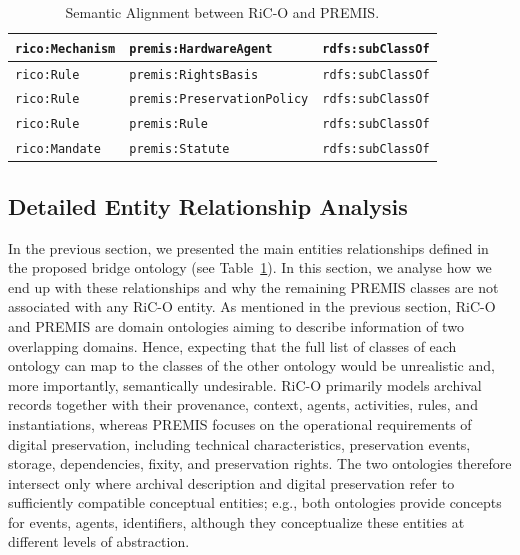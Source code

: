 \documentclass[runningheads]{llncs}
\begin{document}
\begin{table}[ht]
\begin{center}
\begin{tabular}{l  l  c}
				\texttt{rico:Mechanism} & \texttt{premis:HardwareAgent} & \texttt{rdfs:subClassOf} \\\hline
				\texttt{rico:Rule} & \texttt{premis:RightsBasis} & \texttt{rdfs:subClassOf} \\\hline
				\texttt{rico:Rule} & \texttt{premis:PreservationPolicy} & \texttt{rdfs:subClassOf} \\\hline
				\texttt{rico:Rule} & \texttt{premis:Rule} & \texttt{rdfs:subClassOf} \\\hline
				\texttt{rico:Mandate} & \texttt{premis:Statute} & \texttt{rdfs:subClassOf} \\\hline
				\hline
			\end{tabular}
		\end{center}
		\caption{Semantic Alignment between RiC-O and PREMIS.}
		\label{tab:rico-premis-mapping}
	\end{table}
	
	\subsection{Detailed Entity Relationship Analysis}
	\label{subsec:detailed-alignment}
	
	In the previous section, we presented the main entities relationships defined in the proposed bridge ontology (see Table~\ref{tab:rico-premis-mapping}). In this section, we analyse how we end up with these relationships and why the remaining PREMIS classes are not associated with any RiC-O entity. As mentioned in the previous section, RiC-O and PREMIS are domain ontologies aiming to describe information of two overlapping domains. Hence, expecting that the full list of classes of each ontology can map to the classes of the other ontology would be unrealistic and, more importantly, semantically undesirable. RiC-O primarily models archival records together with their provenance, context, agents, activities, rules, and instantiations, whereas PREMIS focuses on the operational requirements of digital preservation, including technical characteristics, preservation events, storage, dependencies, fixity, and preservation rights. The two ontologies therefore intersect only where archival description and digital preservation refer to sufficiently compatible conceptual entities; e.g., both ontologies provide concepts for events, agents, identifiers, although they conceptualize these entities at different levels of abstraction.  
	
\end{document}
